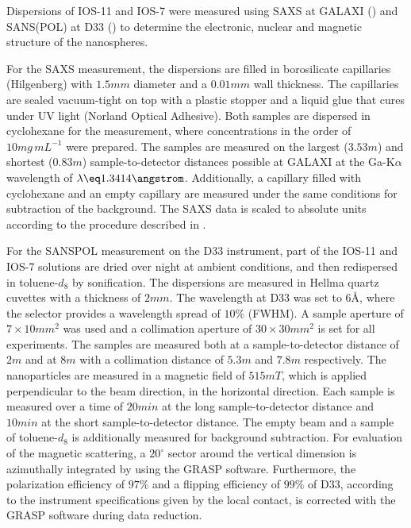 \documentclass[\main/dresen_thesis.tex]{subfiles}
\begin{document}
    Dispersions of IOS-11 and IOS-7 were measured using SAXS at GALAXI () and SANS(POL) at D33 () to determine the electronic, nuclear and magnetic structure of the nanospheres.

    For the SAXS measurement, the dispersions are filled in borosilicate capillaries (Hilgenberg) with $1.5 \unit{mm}$ diameter and a $0.01 \unit{mm}$ wall thickness.
    The capillaries are sealed vacuum-tight on top with a plastic stopper and a liquid glue that cures under UV light (Norland Optical Adhesive).
    Both samples are dispersed in cyclohexane for the measurement, where concentrations in the order of $10 \unit{mg \, mL^{-1}}$ were prepared.
    The samples are measured on the largest ($3.53 \unit{m}$) and shortest ($0.83 \unit{m}$) sample-to-detector distances possible at GALAXI at the Ga-K$\alpha$ wavelength of $\lambda \eq 1.3414 \angstrom$.
    Additionally, a capillary filled with cyclohexane and an empty capillary are measured under the same conditions for subtraction of the background.
    The SAXS data is scaled to absolute units according to the procedure described in .

    For the SANSPOL measurement on the D33 instrument, part of the IOS-11 and IOS-7 solutions are dried over night at ambient conditions, and then redispersed in toluene-$\mathit{d_8}$ by sonification.
    The dispersions are measured in Hellma quartz cuvettes with a thickness of $2 \unit{mm}$.
    The wavelength at D33 was set to $6 \unit{\angstrom}$, where the selector provides a wavelength spread of $10 \%$ (FWHM).
    A sample aperture  of $7 \times 10 \unit{mm^2}$ was used and a collimation aperture of $30 \times 30 \unit{mm^2}$ is set for all experiments.
    The samples are measured both at a sample-to-detector distance of $2 \unit{m}$ and at $8 \unit{m}$ with a collimation distance of $5.3 \unit{m}$ and $7.8 \unit{m}$ respectively.
    The nanoparticles are measured in a magnetic field of $515 \unit{mT}$, which is applied perpendicular to the beam direction, in the horizontal direction.
    Each sample is measured over a time of $20 \unit{min}$ at the long sample-to-detector distance and $10 \unit{min}$ at the short sample-to-detector distance.
    The empty beam and a sample of toluene-$\mathit{d_8}$ is additionally measured for background subtraction.
    For evaluation of the magnetic scattering, a $20^\circ$ sector around the vertical dimension is azimuthally integrated by using the GRASP software.
    Furthermore, the polarization efficiency of $97 \%$ and a flipping efficiency of $99 \%$ of D33, according to the instrument specifications given by the local contact, is corrected with the GRASP software during data reduction.
\end{document}
